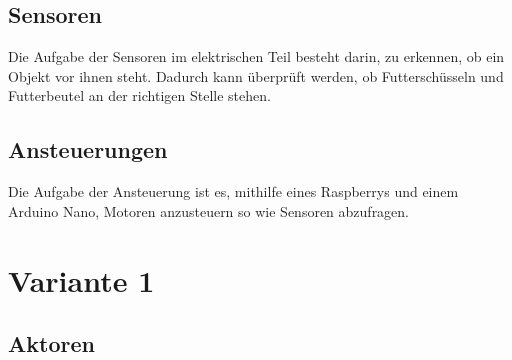 \subsection{Sensoren}
Die Aufgabe der Sensoren im elektrischen Teil besteht darin, zu erkennen, ob ein Objekt vor ihnen steht. Dadurch kann überprüft werden, ob Futterschüsseln und Futterbeutel an der richtigen Stelle stehen.
\subsection{Ansteuerungen}
Die Aufgabe der Ansteuerung ist es, mithilfe eines Raspberrys und einem Arduino Nano, Motoren anzusteuern so wie Sensoren abzufragen. \\

\section{Variante 1}
\subsection{Aktoren}
